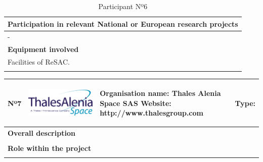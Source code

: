 \begin{longtable}[H]{|p{0.7cm}|p{4cm}|p{7cm}|p{1.3cm}|}
	\multicolumn{4}{|p{13cm}|}{\textbf{Participation in relevant National or European research projects}}  \\ \hline
	
	\multicolumn{4}{|p{14.5cm}|}{-}  \\ \hline
	
	\multicolumn{4}{|p{13cm}|}{\textbf{Equipment involved}}  \\ \hline
	
	\multicolumn{4}{|p{14.5cm}|}{Facilities of ReSAC.}  \\ \hline
	\caption{Participant Nº6}
\end{longtable}

\begin{longtable}[H]{|p{0.7cm}|p{4cm}|p{7cm}|p{1.3cm}|}
	\hline
	\begin{center} Nº7 \end{center} & \begin{center} \includegraphics[scale=0.25]{./logos/Thales_Alenia_Space_Belgium_logo} \end{center} & \begin{center} \textbf{Organisation name:} Thales Alenia Space SAS \newline \textbf{Website:} http://www.thalesgroup.com \end{center} & \begin{center} Type: \end{center} \\ \hline
	
	\multicolumn{4}{|p{13cm}|}{\textbf{Overall description}}  \\ \hline
	
	\multicolumn{4}{|p{14.5cm}|}{}  \\ \hline
	
	\multicolumn{4}{|p{13cm}|}{\textbf{Role within the project}}   \\ \hline
	
	\multicolumn{4}{|p{14.5cm}|}{}  \\ \hline
	

\end{longtable}
